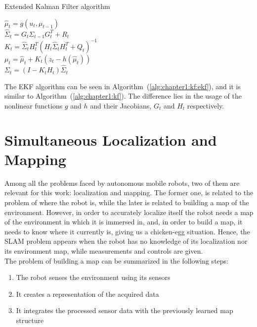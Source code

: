 \begin{algorithm}
    \caption{Extended Kalman Filter algorithm}
    \label{alg:chapter1:kf:ekf}

    \BlankLine
    \BlankLine
    $\hat\mu_t = g \left(u_t, \mu_{t-1}\right)$ \\
    $\hat\Sigma_t = G_t \Sigma_{t-1} G_t^T + R_t$ \\
    \BlankLine
    $K_t = \hat\Sigma_t H_t^T \left(H_t \hat\Sigma_t H_t^T + Q_t\right)^{-1}$ \\
    $\mu_t = \hat\mu_t + K_t \left(z_t - h \left(\hat\mu_t\right) \right) $ \\
    $\Sigma_t = (I - K_t H_t) \hat\Sigma_t$ \\
    \BlankLine
\end{algorithm}

The \ac{EKF} algorithm can be seen in Algorithm~(\ref{alg:chapter1:kf:ekf}), and it is similar to Algorithm~(\ref{alg:chapter1:kf}). The difference lies in the usage of the nonlinear functions $g$ and $h$ and their Jacobians, $G_t$ and $H_t$ respectively.

\section{Simultaneous Localization and Mapping}
\label{sec:chapter1:slam}
Among all the problems faced by autonomous mobile robots, two of them are relevant for this work: localization and mapping. The former one, is related to the problem of where the robot is, while the later is related to building a map of the environment. However, in order to accurately localize itself the robot needs a map of the environment in which it is immersed in, and, in order to build a map, it needs to know where it currently is, giving us a chicken-egg situation. Hence, the \ac{SLAM} problem appears when the robot has no knowledge of its localization nor its environment map, while measurements and controls are given.\\

The problem of building a map can be summarized in the following steps:
\begin{enumerate}
    \item{The robot senses the environment using its sensors}
    \item{It creates a representation of the acquired data}
    \item{It integrates the processed sensor data with the previously learned map structure}
\end{enumerate}


